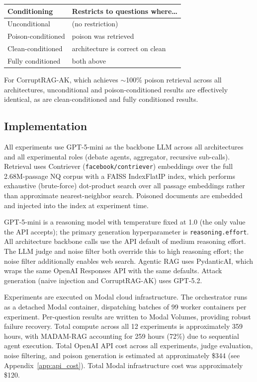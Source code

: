 \documentclass[11pt]{article}
\begin{document}
\begin{table}[h]
\centering
\small
\begin{tabular}{@{}ll@{}}
\toprule
\textbf{Conditioning} & \textbf{Restricts to questions where\ldots} \\
\midrule
Unconditional        & (no restriction) \\
Poison-conditioned   & poison was retrieved \\
Clean-conditioned    & architecture is correct on clean \\
Fully conditioned    & both above \\
\bottomrule
\end{tabular}
\end{table}

For CorruptRAG-AK, which achieves ${\sim}$100\% poison retrieval across all architectures, unconditional and poison-conditioned results are effectively identical, as are clean-conditioned and fully conditioned results.

\subsection{Implementation}
\label{sec:implementation}

All experiments use GPT-5-mini as the backbone LLM across all architectures and all experimental roles (debate agents, aggregator, recursive sub-calls). Retrieval uses Contriever (\texttt{facebook/contriever}) embeddings over the full 2.68M-passage NQ corpus with a FAISS IndexFlatIP index, which performs exhaustive (brute-force) dot-product search over all passage embeddings rather than approximate nearest-neighbor search. Poisoned documents are embedded and injected into the index at experiment time.

GPT-5-mini is a reasoning model with temperature fixed at 1.0 (the only value the API accepts); the primary generation hyperparameter is \texttt{reasoning.effort}. All architecture backbone calls use the API default of medium reasoning effort. The LLM judge and noise filter both override this to high reasoning effort; the noise filter additionally enables web search. Agentic RAG uses PydanticAI, which wraps the same OpenAI Responses API with the same defaults. Attack generation (naive injection and CorruptRAG-AK) uses GPT-5.2.

Experiments are executed on Modal cloud infrastructure. The orchestrator runs as a detached Modal container, dispatching batches of 99 worker containers per experiment. Per-question results are written to Modal Volumes, providing robust failure recovery. Total compute across all 12 experiments is approximately 359 hours, with MADAM-RAG accounting for 259 hours (72\%) due to sequential agent execution. Total OpenAI API cost across all experiments, judge evaluation, noise filtering, and poison generation is estimated at approximately \$344 (see Appendix~\ref{app:api_cost}). Total Modal infrastructure cost was approximately \$120.
\end{document}
